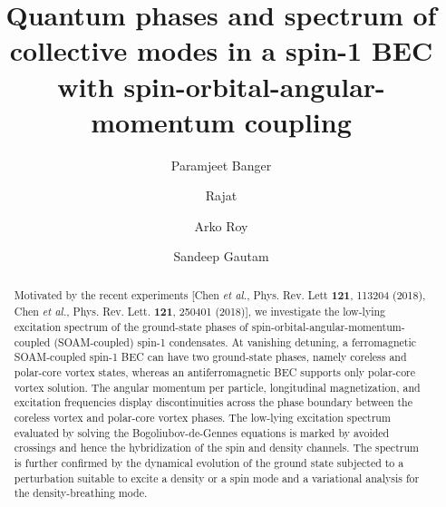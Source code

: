 \documentclass[pra,twocolumn,aps,superscriptaddress,showpacs,longbibliography]{revtex4-1}
\begin{document}
\title{%
Quantum phases and spectrum of collective modes in a spin-1 BEC with spin-orbital-angular-momentum coupling}
\author{Paramjeet Banger}
\author{Rajat} 
\author{Arko Roy}
\author{Sandeep Gautam}

\begin{abstract}
Motivated by the recent experiments [Chen {\em et al.}, Phys. Rev. Lett {\bf 121}, 113204 (2018), 
Chen {\em et al.}, Phys. Rev. Lett. {\bf 121}, 250401 (2018)], we investigate the low-lying excitation spectrum of the ground-state
phases of spin-orbital-angular-momentum-coupled (SOAM-coupled) spin-1 condensates. At vanishing detuning, a ferromagnetic SOAM-coupled 
spin-1 BEC can have two ground-state phases, namely coreless and polar-core vortex states, whereas an antiferromagnetic
BEC supports only polar-core vortex solution. The angular momentum per particle, longitudinal magnetization, and excitation frequencies 
display discontinuities across the phase boundary between the coreless vortex and polar-core vortex phases. %
The low-lying excitation spectrum evaluated by solving
the Bogoliubov-de-Gennes equations is marked by avoided crossings and hence the hybridization of the spin and density 
channels. The spectrum is further confirmed by the dynamical evolution of the ground state subjected to a perturbation suitable
to excite a density or a spin mode and a variational analysis for the density-breathing mode.   

\end{abstract}
\maketitle
\end{document}
